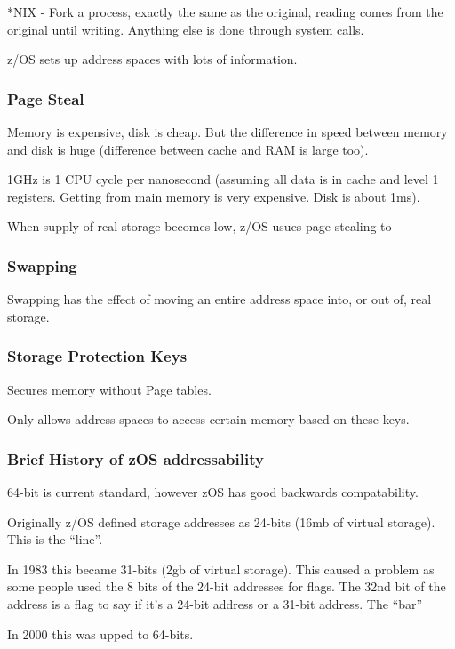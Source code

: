 \documentclass{report}
\begin{document}
*NIX - Fork a process, exactly the same as the original, reading comes from the original until writing. Anything else is done through system calls.

z/OS sets up address spaces with lots of information. 


\subsubsection{Page Steal}

Memory is expensive, disk is cheap. But the difference in speed between memory and disk is huge (difference between cache and RAM is large too).

1GHz is 1 CPU cycle per nanosecond (assuming all data is in cache and level 1 registers. Getting from main memory is very expensive. Disk is about 1ms).

When supply of real storage becomes low, z/OS usues page stealing to 

\subsubsection{Swapping}
Swapping has the effect of moving an entire address space into, or out of, real storage.

\subsubsection{Storage Protection Keys}

Secures memory without Page tables.

Only allows address spaces to access certain memory based on these keys.

\subsubsection{Brief History of zOS addressability}

64-bit is current standard, however zOS has good backwards compatability.

Originally z/OS defined storage addresses as 24-bits (16mb of virtual storage). This is the ``line''.

In 1983 this became 31-bits (2gb of virtual storage). This caused a problem as some people used the 8 bits of the 24-bit addresses for flags. The 32nd bit of the address is a flag to say if it's a 24-bit address or a 31-bit address. The ``bar''

In 2000 this was upped to 64-bits.
\end{document}
